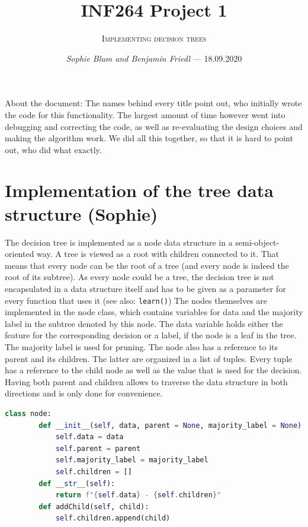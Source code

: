 \documentclass[12pt,a4paper]{scrartcl}		%
\newcommand\svthema{INF264 Project 1}
\newcommand\svperson{Sophie Blum and Benjamin Friedl}
\newcommand\svdatum{18.09.2020}
\newcommand\lvname{Implementing decision trees}
\begin{document}
\title{ \svthema}
\author{\textsc{\lvname}}
\date{ \small \textsl{\svperson} --- \svdatum }
\maketitle

\abstract
About the document:
The names behind every title point out, who initially wrote the code for this functionality. 
The largest amount of time however went into debugging and correcting the code, as well as re-evaluating the 
design choices and making the algorithm work. We did all this together, so that it is hard to point out, who 
did what exactly.

\section{Implementation of the tree data structure (Sophie)}
The decision tree is implemented as a node data structure in a semi-object-oriented way. A tree is viewed as 
a root with children connected to it. That means that every node can be the root of a tree (and every node is 
indeed the root of its subtree). As every node could be a tree, the decision tree is not encapsulated in a 
data structure itself and has to be given as a parameter for every function that uses it (see also: 
\texttt{learn()})
The nodes themselves are implemented in the node class, which contains variables for data and the majority 
label in the subtree denoted by this node. 
The data variable holds either the feature for the corresponding decision or a label, if the node is a leaf 
in the tree.
The majority label is used for pruning.
The node also has a reference to its parent and its children. The latter are organized in a list of tuples. 
Every tuple has a reference to the child node as well as the value that is used for the decision. 
Having both parent and children allows to traverse the data structure in both directions and is only done 
for convenience.

\begin{lstlisting}[language=Python]
    class node: 
        def __init__(self, data, parent = None, majority_label = None):
            self.data = data
            self.parent = parent
            self.majority_label = majority_label
            self.children = []
        def __str__(self):
            return f"{self.data} - {self.children}"
        def addChild(self, child):
            self.children.append(child)
\end{lstlisting}
\end{document}
